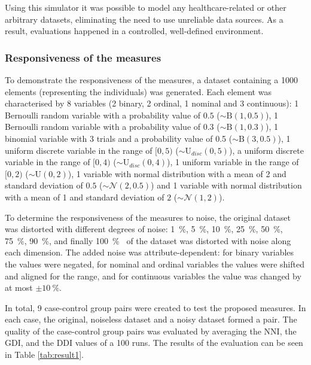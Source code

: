 Using this simulator it was possible to model any healthcare-related or other arbitrary datasets, eliminating the need to use unreliable data sources. As a result, evaluations happened in a controlled, well-defined environment.

\subsubsection{Responsiveness of the measures}
\label{subseq:noise}

To demonstrate the responsiveness of the measures, a dataset containing a 1000 elements (representing the individuals) was generated. Each element was characterised by 8 variables (2 binary, 2 ordinal, 1 nominal and 3 continuous): 1 Bernoulli random variable with a probability value of $0.5$ ($\mathtt{\sim} \textrm{B}(1, 0.5)$), 1 Bernoulli random variable with a probability value of 0.3 ($\mathtt{\sim} \textrm{B}(1, 0.3)$), 1 binomial variable with 3 trials and a probability value of 0.5 ($\mathtt{\sim} \textrm{B}(3, 0.5)$), 1 uniform discrete variable in the range of $[0,5)$ ($\mathtt{\sim} \textrm{U}_{disc}(0, 5)$), a uniform discrete variable in the range of $[0,4)$ ($\mathtt{\sim} \textrm{U}_{disc}(0, 4)$), 1 uniform variable in the range of $[0,2)$ ($\mathtt{\sim} \textrm{U}(0, 2)$), 1 variable with normal distribution with a mean of 2 and standard deviation of $0.5$ ($\mathtt{\sim} \mathcal{N}(2, 0.5)$) and 1 variable with normal distribution with a mean of 1 and standard deviation of $2$ ($\mathtt{\sim} \mathcal{N}(1, 2)$).
					
	To determine the responsiveness of the measures to noise, the original dataset was distorted with different degrees of noise: \SI{1}{\percent}, \SI{5}{\percent}, \SI{10}{\percent}, \SI{25}{\percent}, \SI{50}{\percent}, \SI{75}{\percent}, \SI{90}{\percent},  and finally \SI{100}{\percent} \ of the dataset was distorted with noise along each dimension. The added noise was attribute-dependent: for binary variables the values were negated, for nominal and ordinal variables the values were shifted and aligned for the range, and for continuous variables the value was changed by at most $\pm\SI{10}{\percent}$.
					
	In total, 9 case-control group pairs were created to test the proposed measures. In each case, the original, noiseless dataset and a noisy dataset formed a pair. The quality of the case-control group pairs was evaluated by averaging the NNI, the GDI, and the DDI values of a 100 runs. The results of the evaluation can be seen in Table \ref{tab:result1}.
					
